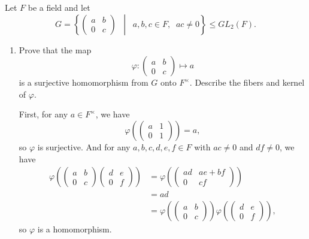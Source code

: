  Let $F$ be a field and let
\begin{equation*}
  G = \left\{
    \begin{pmatrix}
      a & b \\
      0 & c
    \end{pmatrix}
    \;\;\middle|\;\;
    a,b,c\in F,\;\; ac\neq0
  \right\}
  \leq GL_2(F).
\end{equation*}
\begin{enumerate}
\item Prove that the map
  \begin{equation*}
    \varphi\colon
    \begin{pmatrix}
      a & b \\ 0 & c
    \end{pmatrix}
    \mapsto a
  \end{equation*}
  is a surjective homomorphism from $G$ onto $F^\times$. Describe the
  fibers and kernel of $\varphi$.
  \begin{solution}
    First, for any $a\in F^\times$, we have
    \begin{equation*}
      \varphi\left(
      \begin{pmatrix}
        a & 1 \\ 0 & 1
      \end{pmatrix}
      \right) = a,
    \end{equation*}
    so $\varphi$ is surjective. And for any $a,b,c,d,e,f\in F$ with
    $ac\neq0$ and $df\neq0$, we have
    \begin{align*}
      \varphi\left(\begin{pmatrix} a & b \\ 0 & c \end{pmatrix}
              \begin{pmatrix} d & e \\ 0 & f \end{pmatrix}\right)
      &= \varphi\left(\begin{pmatrix} ad & ae + bf \\
          0 & cf \end{pmatrix}\right) \\
      &= ad \\
      &= \varphi\left(\begin{pmatrix} a & b \\ 0 & c \end{pmatrix}\right)
         \varphi\left(\begin{pmatrix} d & e \\ 0 & f \end{pmatrix}\right),
    \end{align*}
    so $\varphi$ is a homomorphism.


\end{solution}
\end{enumerate}
